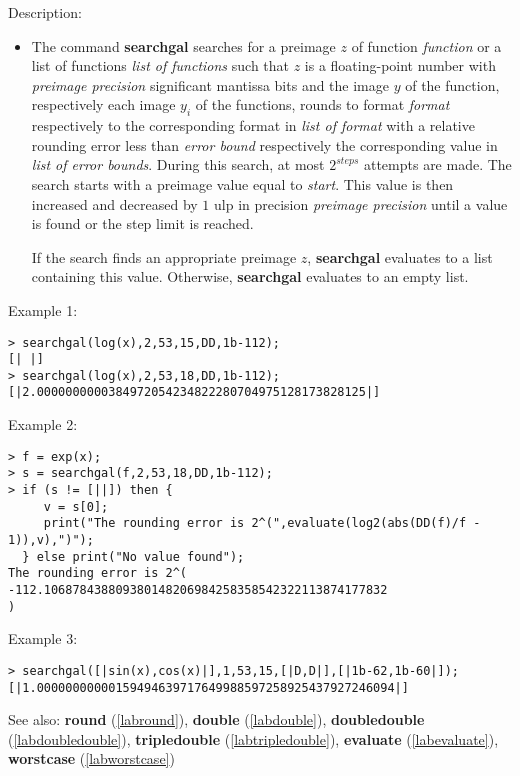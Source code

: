 \noindent Description: \begin{itemize}

\item The command \textbf{searchgal} searches for a preimage $z$ of function
   \emph{function} or a list of functions \emph{list of functions} such that
   $z$ is a floating-point number with \emph{preimage precision}
   significant mantissa bits and the image $y$ of the function,
   respectively each image $y_i$ of the functions, rounds to
   format \emph{format} respectively to the corresponding format in \emph{list of format} 
   with a relative rounding error less than \emph{error bound}
   respectively the corresponding value in \emph{list of error bounds}. During
   this search, at most $2^{steps}$ attempts are made. The search
   starts with a preimage value equal to \emph{start}. This value is then
   increased and decreased by $1$ ulp in precision \emph{preimage precision} 
   until a value is found or the step limit is reached.
    
   If the search finds an appropriate preimage $z$, \textbf{searchgal}
   evaluates to a list containing this value. Otherwise, \textbf{searchgal}
   evaluates to an empty list.
\end{itemize}
\noindent Example 1: 
\begin{center}\begin{minipage}{15cm}\begin{Verbatim}[frame=single]
> searchgal(log(x),2,53,15,DD,1b-112);
[| |]
> searchgal(log(x),2,53,18,DD,1b-112);
[|2.0000000000384972054234822280704975128173828125|]
\end{Verbatim}
\end{minipage}\end{center}
\noindent Example 2: 
\begin{center}\begin{minipage}{15cm}\begin{Verbatim}[frame=single]
> f = exp(x);
> s = searchgal(f,2,53,18,DD,1b-112);
> if (s != [||]) then {
     v = s[0];
     print("The rounding error is 2^(",evaluate(log2(abs(DD(f)/f - 1)),v),")");
  } else print("No value found");
The rounding error is 2^( -112.106878438809380148206984258358542322113874177832 
)
\end{Verbatim}
\end{minipage}\end{center}
\noindent Example 3: 
\begin{center}\begin{minipage}{15cm}\begin{Verbatim}[frame=single]
> searchgal([|sin(x),cos(x)|],1,53,15,[|D,D|],[|1b-62,1b-60|]);
[|1.00000000000159494639717649988597258925437927246094|]
\end{Verbatim}
\end{minipage}\end{center}
See also: \textbf{round} (\ref{labround}), \textbf{double} (\ref{labdouble}), \textbf{doubledouble} (\ref{labdoubledouble}), \textbf{tripledouble} (\ref{labtripledouble}), \textbf{evaluate} (\ref{labevaluate}), \textbf{worstcase} (\ref{labworstcase})
